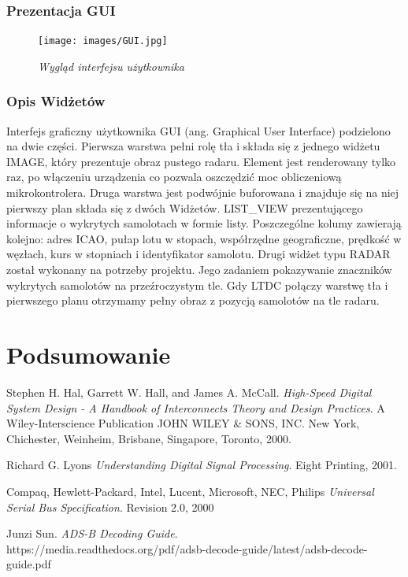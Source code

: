 \documentclass[eng,printmode]{mgr}
\begin{document}
\subsection*{Prezentacja GUI}
\begin{figure}[!h]
    \centering
    \texttt{[image: images/GUI.jpg]}
    \caption{\textit{Wygląd interfejsu użytkownika}}
\end{figure}

\subsection*{Opis Widżetów}
Interfejs graficzny użytkownika GUI (ang. Graphical User Interface) podzielono na dwie części. Pierwsza warstwa pełni rolę tła i składa się z jednego widżetu IMAGE, który prezentuje obraz pustego radaru. Element jest renderowany tylko raz, po włączeniu urządzenia co pozwala oszczędzić moc obliczeniową mikrokontrolera. Druga warstwa jest podwójnie buforowana i znajduje się na niej pierwszy plan składa się z dwóch Widżetów. LIST\_VIEW prezentującego informacje o wykrytych samolotach w formie listy. Poszczególne kolumy zawierają kolejno: adres ICAO, pułap lotu w stopach, współrzędne geograficzne, prędkość w węzłach, kurs w stopniach i identyfikator samolotu. Drugi widżet typu RADAR został wykonany na potrzeby projektu. Jego zadaniem pokazywanie znaczników wykrytych samolotów na przeźroczystym tle. Gdy LTDC połączy warstwę tła i pierwszego planu otrzymamy pełny obraz z pozycją samolotów na tle radaru. 

\chapter{ Podsumowanie }


\begin{thebibliography}{9}
Stephen H. Hal, Garrett W. Hall, and James A. McCall. 
\textit{High-Speed Digital System Design - A Handbook of Interconnects Theory and Design Practices}.
A Wiley-Interscience Publication JOHN WILEY \& SONS, INC.
New York, Chichester, Weinheim, Brisbane, Singapore, Toronto, 2000.

Richard G. Lyons
\textit{Understanding Digital Signal Processing}.
Eight Printing, 2001.

Compaq,
Hewlett-Packard,
Intel,
Lucent,
Microsoft,
NEC,
Philips
\textit{Universal Serial Bus Specification}.
Revision 2.0,
2000

Junzi Sun. 
\textit{ADS-B Decoding Guide}.\\
https://media.readthedocs.org/pdf/adsb-decode-guide/latest/adsb-decode-guide.pdf
 


\end{thebibliography}
\end{document}
